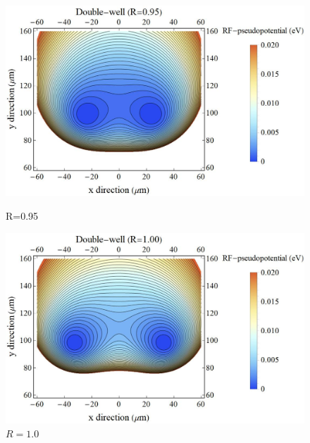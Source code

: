 \begin{figure}[h]
	\begin{minipage}{0.48\linewidth}
		\begin{center}
			\includegraphics[width = 0.9\columnwidth]{./simulation/figure/rf_pseudopotential_R=095.jpg}
			\caption{R=0.95}
			\label{fig:R095}
		\end{center}
	\end{minipage}
	\begin{minipage}{0.48\linewidth}
			\begin{center}
				\includegraphics[width = 0.9\columnwidth]{./simulation/figure/rf_pseudopotential_R=100.jpg}
				\caption{$R=1.0$}
				\label{fig:R100}
			\end{center}
		\end{minipage}
\end{figure}

\clearpage

